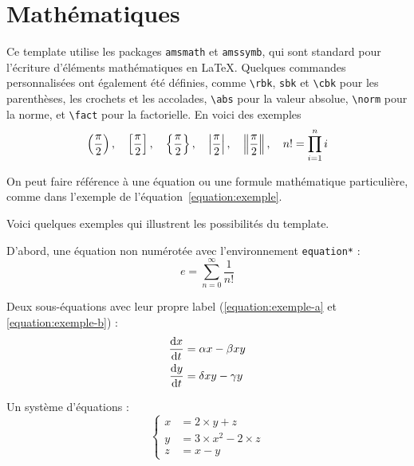 \documentclass[a4paper, 12pt]{report}
\begin{document}
    \section{Mathématiques}\label{section:maths}
    Ce template utilise les packages \texttt{amsmath} et \texttt{amssymb}, qui sont standard pour l'écriture d'éléments mathématiques en \LaTeX{}. Quelques commandes personnalisées ont également été définies, comme \verb+\rbk+, \verb+sbk+ et \verb+\cbk+ pour les parenthèses, les crochets et les accolades, \verb+\abs+ pour la valeur absolue, \verb+\norm+ pour la norme, et \verb+\fact+ pour la factorielle. En voici des exemples
    $$
        \left(\frac{\pi}{2}\right), \quad \left[\frac{\pi}{2}\right], \quad \left\{\frac{\pi}{2}\right\}, \quad \left|\frac{\pi}{2}\right|, \quad \left\|\frac{\pi}{2}\right\|, \quad n! = \prod_{i = 1}^{n} i
    $$
    
    On peut faire référence à une équation ou une formule mathématique particulière, comme dans l'exemple de l'équation~\ref{equation:exemple}.


    

   

    Voici quelques exemples qui illustrent les possibilités du template.

D'abord, une équation non numérotée avec l'environnement \verb+equation*+ :
    \begin{equation*}
        e = \sum_{n=0}^\infty \frac{1}{n!}
    \end{equation*}

Deux sous-équations avec leur propre label (\ref{equation:exemple-a} et \ref{equation:exemple-b}) :
    \begin{subequations}
        \begin{align}
            \frac{\mathrm{d} x}{\mathrm{d} t} & = \alpha x - \beta xy\label{equation:exemple-a} \\
            \frac{\mathrm{d} y}{\mathrm{d} t} & = \delta xy - \gamma y\label{equation:exemple-b}
        \end{align}
    \end{subequations}

    Un système d'équations :
    \begin{equation}
        \left\{
        \begin{aligned}
            x & = 2 \times y + z \\
            y & = 3 \times x^2 - 2 \times z \\
            z & = x - y
        \end{aligned}
        \right.
    \end{equation}
\end{document}
